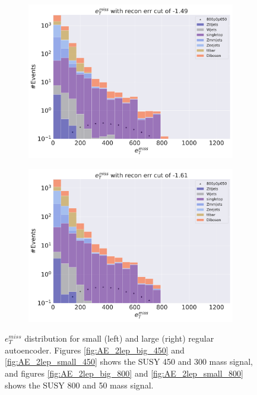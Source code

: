 \begin{figure}[H]
    \hfill
    \begin{subfigure}{.45\textwidth}
        \includegraphics[width=\textwidth]{Figures/AE_testing/big/2lep/b_data_recon_big_rm3_feats_sig_800p0p050_recon_errcut_-1.49.pdf}
        \caption{}
        \label{fig:AE_2lep_big_800_cut_etmiss}
    \end{subfigure}
    \hfill   
    \begin{subfigure}{.45\textwidth}
        \includegraphics[width=\textwidth]{Figures/AE_testing/small/2lep/b_data_recon_big_rm3_feats_sig_800p0p050_recon_errcut_-1.61.pdf}
        \caption{}
        \label{fig:AE_2lep_small_800_cut_etmiss}
    \end{subfigure}
    \hfill      
    \caption[Some $e_T^{miss}$ cuts for AE]{$e_T^{miss}$ distribution for small (left) and large (right) regular autoencoder.
    Figures \ref{fig:AE_2lep_big_450} and \ref{fig:AE_2lep_small_450} shows the SUSY 450 and 300 mass signal, 
    and figures \ref{fig:AE_2lep_big_800} and \ref{fig:AE_2lep_small_800} shows the SUSY 800 and 50 mass signal.}
    \label{fig:AE_2lep_recon_err_both_sig_cut_etmiss}
\end{figure}


